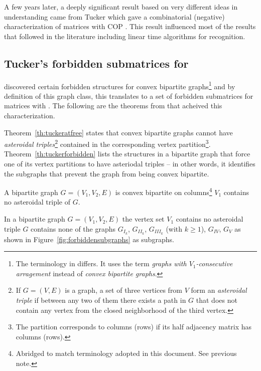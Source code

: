 A few years later, a deeply significant result based on very different
ideas in understanding \COP came from Tucker which gave a
combinatorial (negative) characterization of matrices with COP
\cite{at72}. This result influenced most of the \COP results that
followed in the literature including linear time
algorithms for \COP
recognition.


\subsection{Tucker's forbidden submatrices for \COP}
\label{sec:tucker}

\cite{at72} discovered certain forbidden structures for convex
bipartite graphs\footnote{The terminology in \cite{at72} differs. It
  uses the term {\em graphs with $V_1$-consecutive arragement} instead
  of {\em convex bipartite graphs}.} and by definition of this graph
class, this translates to a set of forbidden submatrices for matrices
with \cop.  The following are the theorems from \cite{at72} that
acheived this characterization.


Theorem~\ref{th:tuckeratfree} states that convex bipartite graphs
cannot have {\em asteroidal triples}\footnote{If $G = (V,E)$ is a
  graph, a set of three vertices from $V$ form an {\em asteroidal
    triple} if between any two of them there exists a path in $G$ that
  does not contain any vertex from the closed neighborhood of the
  third vertex.} contained in the corresponding vertex
partition\footnote{The partition corresponds to columns (rows) if its
  half adjacency matrix has \COP columns (rows).}.
Theorem~\ref{th:tuckerforbidden} lists the structures in a
bipartite graph that force one of its vertex partitions to have
asteriodal triples -- in other words, it identifies the subgraphs that
prevent the graph from being convex bipartite.


\begin{theoremsansproof}
  A bipartite graph $G = (V_1, V_2, E)$ is convex bipartite on
  columns\footnote{Abridged to match terminology adopted in this
    document. See previous note.} \iff $V_1$ contains no asteroidal
  triple of $G$.
  \label{th:tuckeratfree}
\end{theoremsansproof}

\begin{theoremsansproof}
  In a bipartite graph $G = (V_1, V_2, E)$ the vertex set $V_1$
  contains no asteroidal triple \iff $G$ contains none of the graphs
  $G_{I_k}$, $G_{II_k}$, $G_{III_k}$ (with $k \ge 1$), $G_{IV}$,
  $G_{V}$ as shown in Figure~\ref{fig:forbiddensubgraphs} as subgraphs.
  \label{th:tuckerforbidden}
\end{theoremsansproof}


